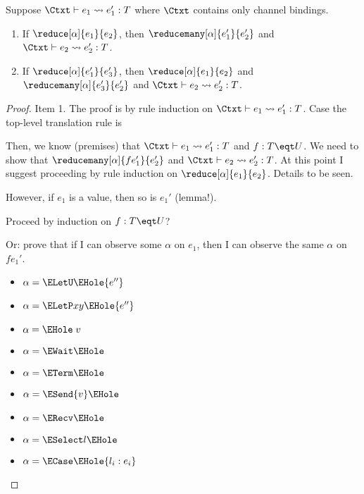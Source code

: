 \newpage
\begin{lemma}
  Suppose $\Ctxt \vdash e_1 \leadsto e'_1 : T$ where $\Ctxt$ contains only
  channel bindings. \begin{enumerate}
  \item If $\reduce[\alpha]{e_1}{e_2}$, then
    $\reducemany[\alpha]{e'_1}{e'_2}$ and $\Ctxt \vdash e_2 \leadsto e'_2 : T$.
  \item If $\reduce[\alpha]{e'_1}{e'_3}$, then $\reduce[\alpha]{e_1}{e_2}$ and
    $\reducemany[\alpha]{e'_3}{e'_2}$ and $\Ctxt \vdash e_2 \leadsto e'_2 : T$.
  \end{enumerate}
\end{lemma}
\begin{proof} Item 1.
  The proof is by rule induction on $\Ctxt \vdash e_1 \leadsto e'_1 : T$.
  Case the top-level translation rule is
  \begin{mathpar}
  \end{mathpar}

  Then, we know (premises) that $\Ctxt \vdash e_1 \leadsto e'_1 : T$ and $f : T
  \eqt U$.
  We need to show that $\reducemany[\alpha]{f e_1'}{e'_2}$ and $\Ctxt \vdash e_2 \leadsto e'_2 : T$.
  At this point I suggest proceeding by rule induction on
  $\reduce[\alpha]{e_1}{e_2}$. Details to be seen.


  However, if $e_1$ is a value, then so is $e_1'$ (lemma!). 

  Proceed by induction on $f : T \eqt U$?

  Or: prove that if I can observe some $\alpha$ on $e_1$, then I can
  observe the same $\alpha$ on $f e_1'$.

  \begin{itemize}
  \item $\alpha = \ELetU\EHole{e''}$
  \item $\alpha = \ELetP xy\EHole{e''}$
  \item $\alpha = \EHole\; v$
  \item $\alpha = \EWait\EHole$
  \item $\alpha = \ETerm\EHole$
  \item $\alpha = \ESend{v}\EHole$
  \item $\alpha = \ERecv\EHole$
  \item $\alpha = \ESelect l \EHole$
  \item $\alpha = \ECase\EHole{l_i: e_i}$
  \end{itemize}
  
\end{proof}


